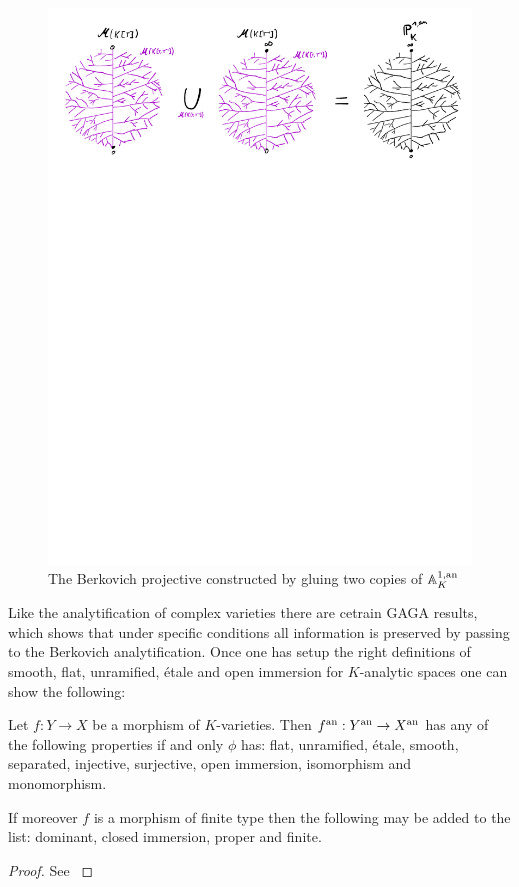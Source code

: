 \begin{figure}[h]
	\centering
	\includegraphics[width=\textwidth]{figures/projective_line}
	\caption{The Berkovich projective constructed by gluing two copies of $\mathbb{A}^{1, \text{an}}_K$}
	\label{fig:berk_projective_line}
\end{figure}


Like the analytification of complex varieties there are cetrain GAGA results, which shows that under specific conditions all information is preserved by passing to the Berkovich analytification. 
Once one has setup the right definitions of smooth, flat, unramified, étale and open immersion for $K$-analytic spaces one can show the following:
\begin{theorem}
	Let $f: Y \to X$  be a morphism of $K$-varieties. Then $f{}^{\text{an}}: Y {}^{\text{an}} \to X{}^{\text{an}}$ has any of the following properties if and only $\phi$ has: flat, unramified, étale, smooth, separated, injective, surjective, open immersion, isomorphism and monomorphism. 

	If moreover $f$ is a morphism of finite type then the following may be added to the list: dominant, closed immersion, proper and finite. 
\end{theorem}
\begin{proof}
	See \cite[][prop.\ 3.4.6 and prop.\ 3.4.7]{berkovichSpectralTheoryAnalytic2012}
\end{proof}

